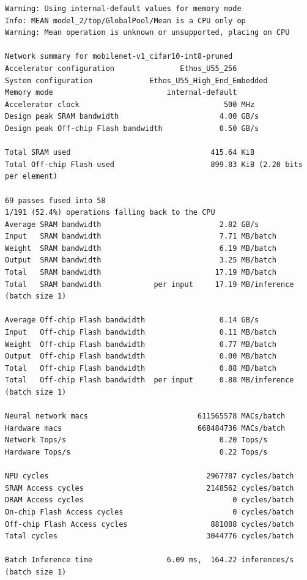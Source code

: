 \begin{lstlisting}[label={lst:vela_output},
    caption=Vela output on an int8 tflite file]
Warning: Using internal-default values for memory mode
Info: MEAN model_2/top/GlobalPool/Mean is a CPU only op
Warning: Mean operation is unknown or unsupported, placing on CPU

Network summary for mobilenet-v1_cifar10-int8-pruned
Accelerator configuration               Ethos_U55_256
System configuration             Ethos_U55_High_End_Embedded
Memory mode                          internal-default
Accelerator clock                                 500 MHz
Design peak SRAM bandwidth                       4.00 GB/s
Design peak Off-chip Flash bandwidth             0.50 GB/s

Total SRAM used                                415.64 KiB
Total Off-chip Flash used                      899.83 KiB (2.20 bits per element)

69 passes fused into 58
1/191 (52.4%) operations falling back to the CPU
Average SRAM bandwidth                           2.82 GB/s
Input   SRAM bandwidth                           7.71 MB/batch
Weight  SRAM bandwidth                           6.19 MB/batch
Output  SRAM bandwidth                           3.25 MB/batch
Total   SRAM bandwidth                          17.19 MB/batch
Total   SRAM bandwidth            per input     17.19 MB/inference (batch size 1)

Average Off-chip Flash bandwidth                 0.14 GB/s
Input   Off-chip Flash bandwidth                 0.11 MB/batch
Weight  Off-chip Flash bandwidth                 0.77 MB/batch
Output  Off-chip Flash bandwidth                 0.00 MB/batch
Total   Off-chip Flash bandwidth                 0.88 MB/batch
Total   Off-chip Flash bandwidth  per input      0.88 MB/inference (batch size 1)

Neural network macs                         611565578 MACs/batch
Hardware macs                               668484736 MACs/batch
Network Tops/s                                   0.20 Tops/s
Hardware Tops/s                                  0.22 Tops/s

NPU cycles                                    2967787 cycles/batch
SRAM Access cycles                            2148562 cycles/batch
DRAM Access cycles                                  0 cycles/batch
On-chip Flash Access cycles                         0 cycles/batch
Off-chip Flash Access cycles                   881088 cycles/batch
Total cycles                                  3044776 cycles/batch

Batch Inference time                 6.09 ms,  164.22 inferences/s (batch size 1)
\end{lstlisting}


